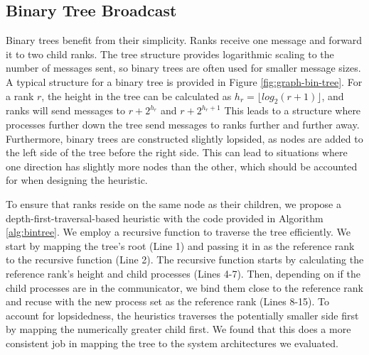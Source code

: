 

\subsection{Binary Tree Broadcast}
Binary trees benefit from their simplicity.
Ranks receive one message and forward it to two child ranks.
The tree structure provides logarithmic scaling to the number of messages sent, so binary trees are often used for smaller message sizes. 
A typical structure for a binary tree is provided in Figure \ref{fig:graph-bin-tree}.
For a rank $r$, the height in the tree can be calculated as $h_r = \lfloor log_2(r+1) \rfloor$, and ranks will send messages to $r + 2^{h_r}$ and $r + 2^{h_r + 1}$
This leads to a structure where processes further down the tree send messages to ranks further and further away.
Furthermore, binary trees are constructed slightly lopsided, as nodes are added to the left side of the tree before the right side. 
This can lead to situations where one direction has slightly more nodes than the other, which should be accounted for when designing the heuristic.



To ensure that ranks reside on the same node as their children, we propose a depth-first-traversal-based heuristic with the code provided in Algorithm \ref{alg:bintree}.
We employ a recursive function to traverse the tree efficiently. 
We start by mapping the tree's root (Line 1) and passing it in as the reference rank to the recursive function (Line 2).
The recursive function starts by calculating the reference rank's height and child processes (Lines 4-7). 
Then, depending on if the child processes are in the communicator, we bind them close to the reference rank and recuse with the new process set as the reference rank (Lines 8-15).
To account for lopsidedness, the heuristics traverses the potentially smaller side first by mapping the numerically greater child first.
We found that this does a more consistent job in mapping the tree to the system architectures we evaluated.



